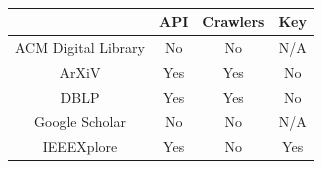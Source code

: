 \documentclass[twocolumn]{article}
\begin{document}
\begin{table}[]
\\[1\baselineskip]
\begin{tabular}{c|c|c|c|}
\cline{2-4}
\multicolumn{1}{l|}{}                     & API & Crawlers & Key \\ \hline
\multicolumn{1}{|c|}{ACM Digital Library} & No  & No       & N/A \\ \hline
\multicolumn{1}{|c|}{ArXiV}               & Yes & Yes      & No  \\ \hline
\multicolumn{1}{|c|}{DBLP}                & Yes & Yes      & No  \\ \hline
\multicolumn{1}{|c|}{Google Scholar}      & No  & No       & N/A \\ \hline
\multicolumn{1}{|c|}{IEEEXplore}          & Yes & No       & Yes \\ \hline
\end{tabular}
\end{table}
\end{document}

